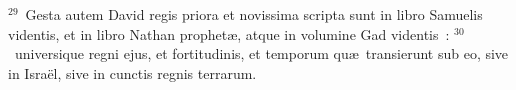 ${}^{29}$~Gesta autem David regis priora et novissima scripta sunt in libro Samuelis videntis, et in libro Nathan prophet\ae , atque in volumine Gad videntis~:
${}^{30}$~universique regni ejus, et fortitudinis, et temporum qu\ae\ transierunt sub eo, sive in Isra\"el, sive in cunctis regnis terrarum.
